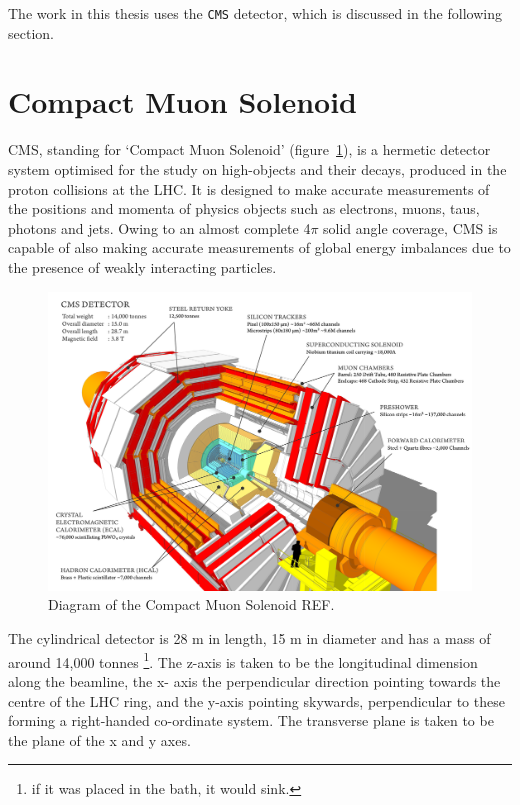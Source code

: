 The work in this thesis uses the \texttt{CMS} detector, which is discussed in 
the following section.


\section{Compact Muon Solenoid}  %
\label{sec:detector_overview}

CMS, standing for `Compact Muon Solenoid' (figure~\ref{fig:cms_diagram}), is a
hermetic detector system 
optimised for the study on high-\Pt objects and their decays, produced in the 
proton collisions at the LHC. It is designed to make accurate measurements of 
the positions and momenta of physics objects such as electrons, muons, taus, 
photons and jets. Owing to an almost complete 4$\pi$ solid angle coverage, CMS is 
capable of also making accurate measurements of global energy imbalances due to 
the presence of weakly interacting particles.

\begin{figure}[hb!]
  \centering
  \includegraphics[width=\textwidth]{Figs/cms_120918_02.png}
  \caption{Diagram of the Compact Muon Solenoid REF.}
  \label{fig:cms_diagram}
\end{figure}

The cylindrical detector is 28 m in length, 15 m in diameter and has a mass of 
around 14,000 tonnes \footnote{if it was placed in the bath, it would sink.}. 
The z-axis is taken to be the longitudinal dimension along the beamline, the x-
axis the perpendicular direction pointing towards the centre of the LHC ring, 
and the y-axis pointing skywards, perpendicular to these forming a right-handed 
co-ordinate system. The transverse plane is taken to be the plane of the x and y
axes.

